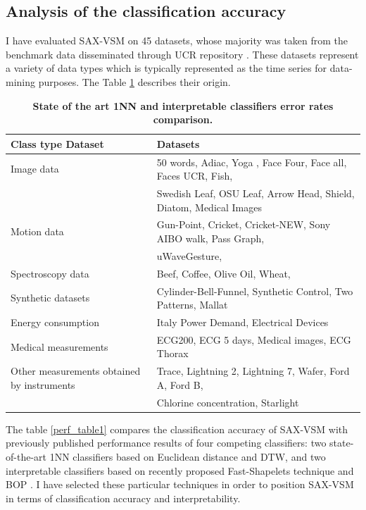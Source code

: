 \subsection{Analysis of the classification accuracy}
I have evaluated SAX-VSM on 45 datasets, whose majority was taken from the benchmark data disseminated 
through UCR repository \cite{ucr}. These datasets represent a variety of data types which is typically represented 
as the time series for data-mining purposes. The Table \ref{data_typetable1} describes their origin.

\begin{table}[t]
\caption{\bf State of the art 1NN and interpretable classifiers error rates comparison.}
\vspace{0.4cm}
 \label{data_typetable1}
\centering
{\setlength{\extrarowheight}{2pt}%
{\footnotesize
\begin{tabularx}{\linewidth}{@{} l l @{}}
\hline
Class type Dataset & Datasets \\[0.5ex]
\hline
Image data & 50 words, Adiac, Yoga , Face Four, Face all, Faces UCR, Fish, \\
 & Swedish Leaf, OSU Leaf, Arrow Head, Shield, Diatom, Medical Images \\[0.5ex]
Motion data & Gun-Point, Cricket, Cricket-NEW, Sony AIBO walk, Pass Graph, \\ 
 & uWaveGesture, \\[0.5ex]
Spectroscopy data & Beef, Coffee, Olive Oil, Wheat, \\[0.5ex]
Synthetic datasets & Cylinder-Bell-Funnel, Synthetic Control, Two Patterns, Mallat \\[0.5ex]
Energy consumption & Italy Power Demand, Electrical Devices \\[0.5ex]
Medical measurements & ECG200, ECG 5 days, Medical images, ECG Thorax \\[0.5ex]
Other measurements obtained by instruments & Trace, Lightning 2, Lightning 7, Wafer, Ford A, Ford B, \\
 & Chlorine concentration, Starlight \\[0.5ex]
\hline
\end{tabularx}
}}
\end{table}

The table \ref{perf_table1} compares the classification accuracy of \mbox{SAX-VSM} with previously published 
performance results of four competing classifiers: 
two state-of-the-art 1NN classifiers based on Euclidean distance and DTW, 
and two interpretable classifiers based on recently proposed Fast-Shapelets technique \cite{fast-shapelets} 
and BOP \cite{bag_patterns}.
I have selected these particular techniques in order to position SAX-VSM in terms of classification accuracy and 
interpretability. 

